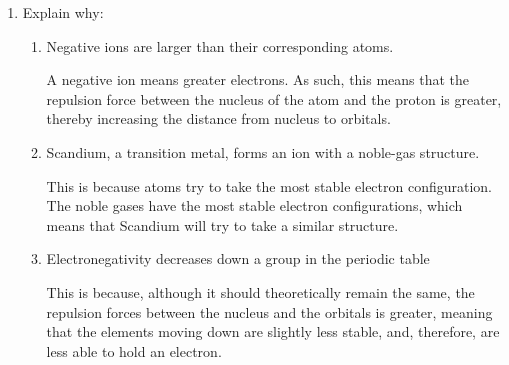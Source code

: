 \documentclass[12pt]{article}
\begin{document}
\begin{enumerate}
  \item Explain why:

    \begin{enumerate}

      \item Negative ions are larger than their corresponding atoms.

        \begin{justifying}
          A negative ion means greater electrons. As such, this means that the repulsion force between the nucleus of the atom and the proton is greater, thereby increasing the distance from nucleus to orbitals.
        \end{justifying}

      \item Scandium, a transition metal, forms an ion with a noble-gas structure.

        \begin{justifying}
          This is because atoms try to take the most stable electron configuration. The noble gases have the most stable electron configurations, which means that Scandium will try to take a similar structure.
        \end{justifying}

      \item Electronegativity decreases down a group in the periodic table

        \begin{justifying}
          This is because, although it should theoretically remain the same, the repulsion forces between the nucleus and the orbitals is greater, meaning that the elements moving down are slightly less stable, and, therefore, are less able to hold an electron.
        \end{justifying}

    \end{enumerate}

\end{enumerate}
\end{document}
